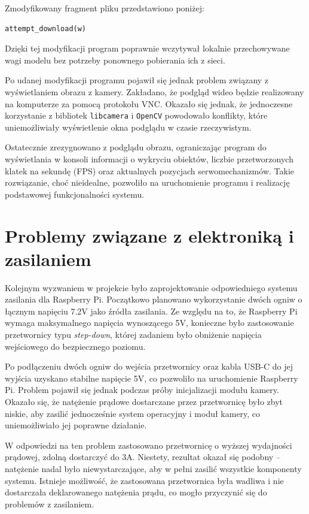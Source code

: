 \documentclass[a4paper,twoside,12pt]{book}
\begin{document}
Zmodyfikowany fragment pliku przedstawiono poniżej:
\begin{lstlisting}[language=Python, caption={Usunięcie funkcji \texttt{attempt\_download} z pliku \texttt{experimental.py}.}, label={lst:attempt_download_removal}, captionpos=b]
attempt_download(w)
\end{lstlisting}

Dzięki tej modyfikacji program poprawnie wczytywał lokalnie przechowywane wagi modelu bez potrzeby ponownego pobierania ich z sieci.

Po udanej modyfikacji programu pojawił się jednak problem związany z wyświetlaniem obrazu z kamery. Zakładano, że podgląd wideo będzie realizowany na komputerze za pomocą protokołu VNC. Okazało się jednak, że jednoczesne korzystanie z bibliotek \texttt{libcamera} i \texttt{OpenCV} powodowało konflikty, które uniemożliwiały wyświetlenie okna podglądu w czasie rzeczywistym. 

Ostatecznie zrezygnowano z podglądu obrazu, ograniczając program do wyświetlania w konsoli informacji o wykryciu obiektów, liczbie przetworzonych klatek na sekundę (FPS) oraz aktualnych pozycjach serwomechanizmów. Takie rozwiązanie, choć nieidealne, pozwoliło na uruchomienie programu i realizację podstawowej funkcjonalności systemu.


\section{Problemy związane z elektroniką i zasilaniem}

Kolejnym wyzwaniem w projekcie było zaprojektowanie odpowiedniego systemu zasilania dla Raspberry Pi. Początkowo planowano wykorzystanie dwóch ogniw o łącznym napięciu 7.2V jako źródła zasilania. Ze względu na to, że Raspberry Pi wymaga maksymalnego napięcia wynoszącego 5V, konieczne było zastosowanie przetwornicy typu \textit{step-down}, której zadaniem było obniżenie napięcia wejściowego do bezpiecznego poziomu.

Po podłączeniu dwóch ogniw do wejścia przetwornicy oraz kabla USB-C do jej wyjścia uzyskano stabilne napięcie 5V, co pozwoliło na uruchomienie Raspberry Pi. Problem pojawił się jednak podczas próby inicjalizacji modułu kamery. Okazało się, że natężenie prądowe dostarczane przez przetwornicę było zbyt niskie, aby zasilić jednocześnie system operacyjny i moduł kamery, co uniemożliwiało jej poprawne działanie.

W odpowiedzi na ten problem zastosowano przetwornicę o wyższej wydajności prądowej, zdolną dostarczyć do 3A. Niestety, rezultat okazał się podobny – natężenie nadal było niewystarczające, aby w pełni zasilić wszystkie komponenty systemu. Istnieje możliwość, że zastosowana przetwornica była wadliwa i nie dostarczała deklarowanego natężenia prądu, co mogło przyczynić się do problemów z zasilaniem.
\end{document}
